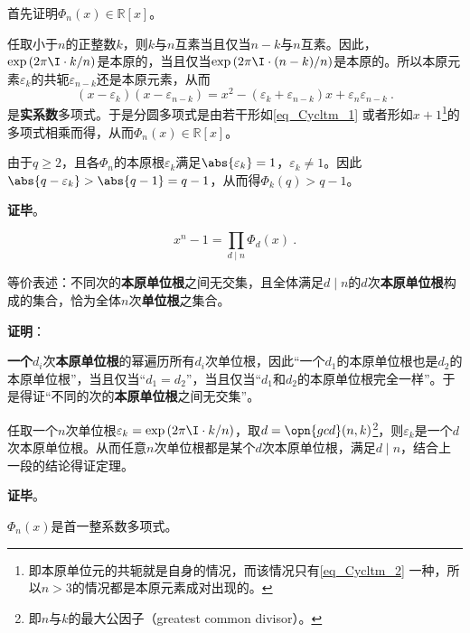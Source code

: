 首先证明$\Phi_n(x)\in\mathbb{R}[x]$。

任取小于$n$的正整数$k$，则$k$与$n$互素当且仅当$n-k$与$n$互素。因此，$\exp{(2\pi\I\cdot  k/n)}$是本原的，当且仅当$\exp{(2\pi\I\cdot  (n-k)/n)}$是本原的。所以本原元素$\varepsilon_k$的共轭$\varepsilon_{n-k}$还是本原元素，从而
\begin{equation}\label{eq_Cycltm_1}
(x-\varepsilon_k)(x-\varepsilon_{n-k})=x^2-(\varepsilon_k+\varepsilon_{n-k})x+\varepsilon_n\varepsilon_{n-k}~.
\end{equation}
是\textbf{实系数}多项式。于是分圆多项式是由若干形如\autoref{eq_Cycltm_1} 或者形如$x+1$\footnote{即本原单位元的共轭就是自身的情况，而该情况只有\autoref{eq_Cycltm_2} 一种，所以$n>3$的情况都是本原元素成对出现的。}的多项式相乘而得，从而$\Phi_n(x)\in\mathbb{R}[x]$。

由于$q\geq 2$，且各$\Phi_n$的本原根$\varepsilon_k$满足$\abs{\varepsilon_k}=1$，$\varepsilon_k\neq 1$。因此$\abs{q-\varepsilon_k}>\abs{q-1}=q-1$，从而得$\Phi_k(q)>q-1$。


\textbf{证毕}。




\begin{theorem}{}\label{the_Cycltm_1}
\begin{equation}
x^n-1 = \prod_{d\mid n}\Phi_d(x)~.
\end{equation}

等价表述：不同次的\textbf{本原单位根}之间无交集，且全体满足$d\mid n$的$d$次\textbf{本原单位根}构成的集合，恰为全体$n$次\textbf{单位根}之集合。
\end{theorem}

\textbf{证明}：

\textbf{一个}$d_i$次\textbf{本原单位根}的幂遍历所有$d_i$次单位根，因此“一个$d_1$的本原单位根也是$d_2$的本原单位根”，当且仅当“$d_1=d_2$”，当且仅当“$d_1$和$d_2$的本原单位根完全一样”。于是得证“不同的次的\textbf{本原单位根}之间无交集”。

任取一个$n$次单位根$\varepsilon_k=\exp{(2\pi\I\cdot  k/n)}$，取$d=\opn{gcd}(n, k)$\footnote{即$n$与$k$的最大公因子（greatest common divisor）。}，则$\varepsilon_k$是一个$d$次本原单位根。从而任意$n$次单位根都是某个$d$次本原单位根，满足$d\mid n$，结合上一段的结论得证定理。

\textbf{证毕}。



\begin{theorem}{}\label{the_Cycltm_2}
$\Phi_n(x)$是首一整系数多项式。
\end{theorem}

